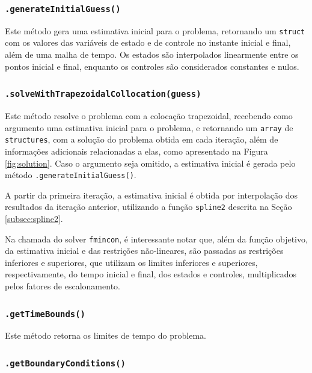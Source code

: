\subsubsection{\texttt{.generateInitialGuess()}}
\label{subsubsec:generateinitialguess}

Este método gera uma estimativa inicial para o problema, retornando um \texttt{struct} com os valores das variáveis de estado e de controle no instante inicial e final, além de uma malha de tempo. Os estados são interpolados linearmente entre os pontos inicial e final, enquanto os controles são considerados constantes e nulos.

\subsubsection{\texttt{.solveWithTrapezoidalCollocation(guess)}}
\label{subsubsec:solvewithtrapezoidalcollocation}

Este método resolve o problema com a colocação trapezoidal, recebendo como argumento uma estimativa inicial para o problema, e retornando um \texttt{array} de \texttt{structures}, com a solução do problema obtida em cada iteração, além de informações adicionais relacionadas a elas, como apresentado na Figura \ref{fig:solution}. Caso o argumento seja omitido, a estimativa inicial é gerada pelo método \texttt{.generateInitialGuess()}.

A partir da primeira iteração, a estimativa inicial é obtida por interpolação dos resultados da iteração anterior, utilizando a função \texttt{spline2} descrita na Seção \ref{subsec:spline2}.

Na chamada do solver \texttt{fmincon}, é interessante notar que, além da função objetivo, da estimativa inicial e das restrições não-lineares, são passadas as restrições inferiores e superiores, que utilizam os limites inferiores e superiores, respectivamente, do tempo inicial e final, dos estados e controles, multiplicados pelos fatores de escalonamento.

\subsubsection{\texttt{.getTimeBounds()}}
\label{subsubsec:gettimebounds}

Este método retorna os limites de tempo do problema.

\subsubsection{\texttt{.getBoundaryConditions()}}
\label{subsubsec:getboundaryconditions}

